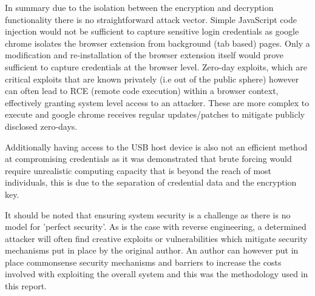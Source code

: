 In summary due to the isolation between the encryption and decryption functionality there is no straightforward attack vector. Simple JavaScript code injection would not be sufficient to capture sensitive login credentials as google chrome isolates the browser extension from background (tab based) pages. Only a modification and re-installation of the browser extension itself would prove sufficient to capture credentials at the browser level. Zero-day exploits, which are critical exploits that are known privately (i.e out of the public sphere) however can often lead to RCE (remote code execution) within a browser context, effectively granting system level access to an attacker. These are more complex to execute and google chrome receives regular updates/patches to mitigate publicly disclosed zero-days.

Additionally having access to the USB host device is also not an efficient method at compromising credentials as it was demonstrated that brute forcing would require unrealistic computing capacity that is beyond the reach of most individuals, this is due to the separation of credential data and the encryption key.

It should be noted that ensuring system security is a challenge as there is no model for 'perfect security'. As is the case with reverse engineering, a determined attacker will often find creative exploits or vulnerabilities which mitigate security mechanisms put in place by the original author. An author can however put in place commonsense security mechanisms and barriers to increase the costs involved with exploiting the overall system and this was the methodology used in this report.


